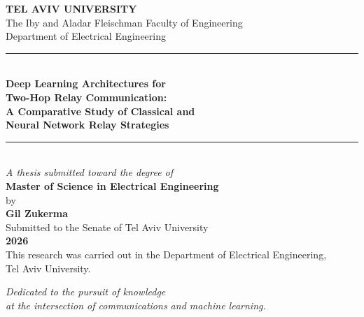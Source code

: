 \documentclass[12pt,a4paper,oneside]{report}
\theoremstyle{definition}
\begin{document}
\begin{titlepage}
\begin{center}
\vspace*{1cm}

{\large\textbf{TEL AVIV UNIVERSITY}}\\[4pt]
{\large The Iby and Aladar Fleischman Faculty of Engineering}\\[4pt]
{\large Department of Electrical Engineering}\\[2cm]

\rule{\textwidth}{1.5pt}\\[0.5cm]
{\LARGE\bfseries\color{tauBlue}
Deep Learning Architectures for\\[8pt]
Two-Hop Relay Communication:\\[8pt]
A Comparative Study of Classical and\\[8pt]
Neural Network Relay Strategies}\\[0.5cm]
\rule{\textwidth}{1.5pt}\\[1.5cm]

{\large\textit{A thesis submitted toward the degree of}}\\[4pt]
{\large\textbf{Master of Science in Electrical Engineering}}\\[2cm]

{\large by}\\[6pt]
{\Large\bfseries Gil Zukerma}\\[2cm]

{\large Submitted to the Senate of Tel Aviv University}\\[4pt]
{\large \textbf{2026}}\\[2cm]

\vfill
{\normalsize This research was carried out in the Department of Electrical Engineering,\\
Tel Aviv University.}
\end{center}
\end{titlepage}

\frontmatter
{}

\clearpage
\thispagestyle{empty}
\vspace*{5cm}
\begin{center}
\textit{Dedicated to the pursuit of knowledge\\
at the intersection of communications and machine learning.}
\end{center}
\clearpage
\end{document}
